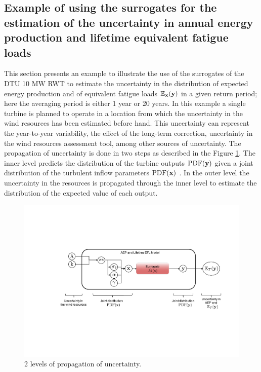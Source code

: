 \documentclass[preprint,12pt]{elsarticle}
\begin{document}

\subsection{Example of using the surrogates for the estimation of the  uncertainty in annual energy production and lifetime equivalent fatigue loads}
\label{subsec_Final_EX}

This section presents an example to illustrate the use of the surrogates of the DTU 10 MW RWT to estimate the uncertainty in the distribution of expected energy production and of equivalent fatigue loads $\mathbb{E}_{\mathbf{x}}(\mathbf{y})$ in a given return period; here the averaging period is either 1 year or 20 years. In this example a single turbine is planned to operate in a location from which the uncertainty in the wind resources has been estimated before hand. This uncertainty can represent the year-to-year variability, the effect of the long-term correction, uncertainty in the wind resources assessment tool, among other sources of uncertainty. The propagation of uncertainty is done in two steps as described in the Figure \ref{fig_2_UQ}. The inner level predicts the distribution of the turbine outputs $\mathrm{PDF}(\mathbf{y})$ given a joint distribution of the turbulent inflow parameters $\mathrm{PDF}(\mathbf{x})$ . In the outer level the uncertainty in the resources is propagated through the inner level to estimate the distribution of the expected value of each output.

\begin{figure}[h!]
\begin{centering}
\includegraphics[width=0.8\linewidth]{Figures/2level_propagation.pdf}
\caption{2 levels of propagation of uncertainty.}
\label{fig_2_UQ}
\end{centering}
\end{figure}
\end{document}
